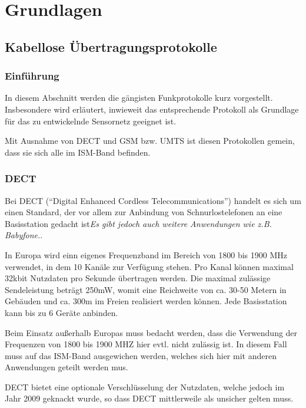 
\chapter{Grundlagen}\label{Grundlagen}

\section{Kabellose Übertragungsprotokolle}
\subsection{Einführung}
In diesem Abschnitt werden die gängisten Funkprotokolle kurz vorgestellt. Insbesondere wird erläutert,
inwieweit das entsprechende Protokoll als Grundlage für das zu entwickelnde Sensornetz geeignet ist.

Mit Ausnahme von DECT und GSM bzw. UMTS ist diesen Protokollen gemein, dass sie sich alle im ISM-Band 
befinden. 

\subsection{DECT}

Bei DECT ("`Digital Enhanced Cordless Telecommunications"') handelt es sich um einen Standard, 
der vor allem zur Anbindung von Schnurlostelefonen an eine Basisstation gedacht ist\textsl{Es gibt
jedoch auch weitere Anwendungen wie z.B. Babyfone.}. 

In Europa wird einn eigenes Frequenzband im Bereich von 1800 bis 1900 MHz verwendet, in dem 10 
Kanäle zur Verfügung stehen. Pro Kanal können maximal 32kbit Nutzdaten pro Sekunde übertragen
werden. Die maximal zulässige Sendeleistung beträgt 250mW, womit eine Reichweite von ca. 30-50
Metern in Gebäuden und ca. 300m im Freien realisiert werden können. Jede Basisstation kann
bis zu 6 Geräte anbinden.

Beim Einsatz außerhalb Europas muss bedacht werden, dass die Verwendung der Frequenzen von
1800 bis 1900 MHZ hier evtl. nicht zulässig ist. In diesem Fall muss auf das ISM-Band 
ausgewichen werden, welches sich hier mit anderen Anwendungen geteilt werden mus.

DECT bietet eine optionale Verschlüsselung der Nutzdaten, welche jedoch im Jahr 2009 geknackt
wurde, so dass DECT mittlerweile als unsicher gelten muss.

